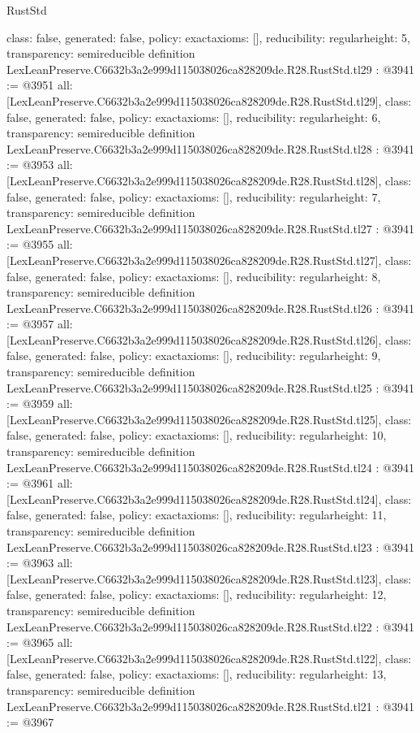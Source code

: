 \begin{lexlean}{RustStd}
\begin{coremodule}
{  class: false,
  generated: false,
  policy: exact{axioms: []},
  reducibility: regular{height: 5},
  transparency: semireducible
}
definition LexLeanPreserve.C6632b3a2e999d115038026ca828209de.R28.RustStd.tl29 : @3941 := @3951 {
  all: [LexLeanPreserve.C6632b3a2e999d115038026ca828209de.R28.RustStd.tl29],
  class: false,
  generated: false,
  policy: exact{axioms: []},
  reducibility: regular{height: 6},
  transparency: semireducible
}
definition LexLeanPreserve.C6632b3a2e999d115038026ca828209de.R28.RustStd.tl28 : @3941 := @3953 {
  all: [LexLeanPreserve.C6632b3a2e999d115038026ca828209de.R28.RustStd.tl28],
  class: false,
  generated: false,
  policy: exact{axioms: []},
  reducibility: regular{height: 7},
  transparency: semireducible
}
definition LexLeanPreserve.C6632b3a2e999d115038026ca828209de.R28.RustStd.tl27 : @3941 := @3955 {
  all: [LexLeanPreserve.C6632b3a2e999d115038026ca828209de.R28.RustStd.tl27],
  class: false,
  generated: false,
  policy: exact{axioms: []},
  reducibility: regular{height: 8},
  transparency: semireducible
}
definition LexLeanPreserve.C6632b3a2e999d115038026ca828209de.R28.RustStd.tl26 : @3941 := @3957 {
  all: [LexLeanPreserve.C6632b3a2e999d115038026ca828209de.R28.RustStd.tl26],
  class: false,
  generated: false,
  policy: exact{axioms: []},
  reducibility: regular{height: 9},
  transparency: semireducible
}
definition LexLeanPreserve.C6632b3a2e999d115038026ca828209de.R28.RustStd.tl25 : @3941 := @3959 {
  all: [LexLeanPreserve.C6632b3a2e999d115038026ca828209de.R28.RustStd.tl25],
  class: false,
  generated: false,
  policy: exact{axioms: []},
  reducibility: regular{height: 10},
  transparency: semireducible
}
definition LexLeanPreserve.C6632b3a2e999d115038026ca828209de.R28.RustStd.tl24 : @3941 := @3961 {
  all: [LexLeanPreserve.C6632b3a2e999d115038026ca828209de.R28.RustStd.tl24],
  class: false,
  generated: false,
  policy: exact{axioms: []},
  reducibility: regular{height: 11},
  transparency: semireducible
}
definition LexLeanPreserve.C6632b3a2e999d115038026ca828209de.R28.RustStd.tl23 : @3941 := @3963 {
  all: [LexLeanPreserve.C6632b3a2e999d115038026ca828209de.R28.RustStd.tl23],
  class: false,
  generated: false,
  policy: exact{axioms: []},
  reducibility: regular{height: 12},
  transparency: semireducible
}
definition LexLeanPreserve.C6632b3a2e999d115038026ca828209de.R28.RustStd.tl22 : @3941 := @3965 {
  all: [LexLeanPreserve.C6632b3a2e999d115038026ca828209de.R28.RustStd.tl22],
  class: false,
  generated: false,
  policy: exact{axioms: []},
  reducibility: regular{height: 13},
  transparency: semireducible
}
definition LexLeanPreserve.C6632b3a2e999d115038026ca828209de.R28.RustStd.tl21 : @3941 := @3967 {
}
\end{coremodule}
\end{lexlean}
